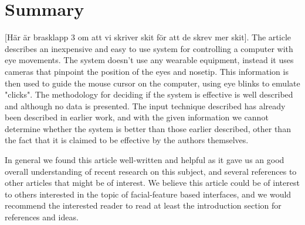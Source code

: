 \documentclass[a4paper,10pt]{article}
\begin{document}
\section{Summary}
[Här är brasklapp 3 om att vi skriver skit för att de skrev mer skit].
The article describes an inexpensive and easy to use system for controlling a computer with eye movements. The system doesn't use any wearable equipment, instead it uses cameras that pinpoint the position of the eyes and nosetip. This information is then used to guide the mouse cursor on the computer, using eye blinks to emulate "clicks". The methodology for deciding if the system is effective is well described and although no data is presented. The input technique described has already been described in earlier work, and with the given information we cannot determine whether the system is better than those earlier described, other than the fact that it is claimed to be effective by the authors themselves.

In general we found this article well-written and helpful as it gave us an good overall understanding of recent research on this subject, and several references to other articles that might be of interest. We believe this article could be of interest to others interested in the topic of facial-feature based interfaces, and we would recommend the interested reader to read at least the introduction section for references and ideas.
\end{document}
